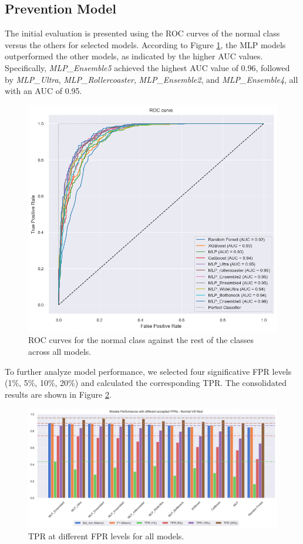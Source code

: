 \subsection{Prevention Model}
The initial evaluation is presented using the ROC curves of the normal class versus the others for selected models.
According to Figure \ref{fig:ROC_normVSrest_allmodels}, the MLP models outperformed the other models, as 
indicated by the higher AUC values.
Specifically, \textit{MLP\_Ensemble5} achieved the highest AUC value of 0.96, followed 
by \textit{MLP\_Ultra}, \textit{MLP\_Rollercoaster}, \textit{MLP\_Ensemble2}, 
and \textit{MLP\_Ensemble4}, all with an AUC of 0.95.

\begin{figure}[H]
    \centering
    \includegraphics[width=1\columnwidth]{./images/ROC_normVSrest_allmodels.png}
    \caption{ROC curves for the normal class against the rest of the classes across all models.}
    \label{fig:ROC_normVSrest_allmodels}
\end{figure}

To further analyze model performance, we selected four significative FPR levels (1\%, 5\%, 10\%, 20\%) and 
calculated the corresponding TPR. The consolidated results are shown in 
Figure \ref{fig:normVSrest_all}.

\begin{figure}[htpb]
    \centering
    \includegraphics[width=.9\textwidth]{./images/nomrVSrest_all.png}
    \caption{TPR at different FPR levels for all models.}
    \label{fig:normVSrest_all}
\end{figure}

